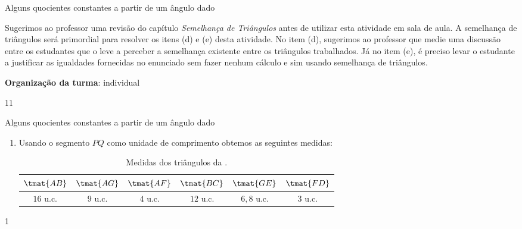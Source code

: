 \begin{sugestions}{Alguns quocientes constantes a partir de um ângulo dado}
{
Sugerimos ao professor uma revisão do capítulo {\textit{Semelhança de Triângulos}} antes de utilizar esta atividade em sala de aula. A semelhança de triângulos será primordial para resolver os itens (d) e (e) desta atividade. No item (d), sugerimos ao professor que medie uma discussão entre os estudantes que o leve a perceber a semelhança existente entre os triângulos trabalhados. Já no item (e), é preciso levar o estudante a justificar as igualdades fornecidas no enunciado sem fazer nenhum cálculo e sim usando semelhança de triângulos. 

\textbf{Organização da turma}: individual
}{1}{1}
\end{sugestions}
\begin{answer}{Alguns quocientes constantes a partir de um ângulo dado}
{
\begin{enumerate}
\item Usando o segmento $PQ$ como unidade de comprimento obtemos as seguintes medidas:

\begin{table}[H]
\centering
\begin{tabular}{|c|c|c|c|c|c|}
\hline
$\tmat{AB}$   & $\tmat{AG}$ & $\tmat{AF}$ & $\tmat{BC}$ & $\tmat{GE}$ & $\tmat{FD}$   \\  \hline
$16$ u.c.  & $9$ u.c. & $4$ u.c.  &  $12$ u.c. &  $6,8$ u.c. & $3$ u.c.   \\\hline
\end{tabular}
\caption{Medidas dos triângulos da .}
\end{table}
\end{enumerate}
}{1}
\end{answer}
\clearmargin
\mspace{.25em}
